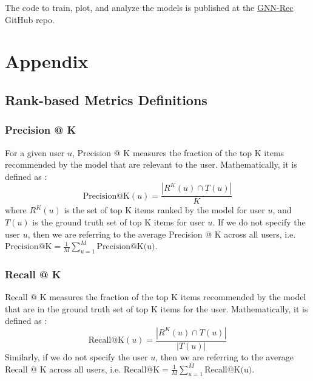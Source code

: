 \documentclass{article}
\begin{document}

The code to train, plot, and analyze the models is published at the \href{https://github.com/thisisalbertliang/gnn-rec}{GNN-Rec} GitHub repo.

\newpage

\section{Appendix}


\subsection{Rank-based Metrics Definitions} \label{rank-metrics-def}

\subsubsection{Precision @ K}

For a given user $u$, Precision @ K measures the fraction of the top K items recommended by the model that are relevant to the user. Mathematically, it is defined as \cite{survey}:
$$
\mbox{Precision@K}(u) = \frac{| R^K(u) \cap T(u) |}{K}
$$
where $R^K(u)$ is the set of top K items ranked by the model for user $u$, and $T(u)$ is the ground truth set of top K items for user $u$. If we do not specify the user $u$, then we are referring to the average Precision @ K across all users, i.e. $\mbox{Precision@K} = \frac{1}{M} \sum_{u = 1}^M \mbox{Precision@K(u)}$.

\subsubsection{Recall @ K}

Recall @ K measures the fraction of the top K items recommended by the model that are in the ground truth set of top K items for the user. Mathematically, it is defined as \cite{survey}:
$$
\mbox{Recall@K}(u) = \frac{| R^K(u) \cap T(u) |}{|T(u)|}
$$
Similarly, if we do not specify the user $u$, then we are referring to the average Recall @ K across all users, i.e. $\mbox{Recall@K} = \frac{1}{M} \sum_{u = 1}^M \mbox{Recall@K(u)}$.
\end{document}
